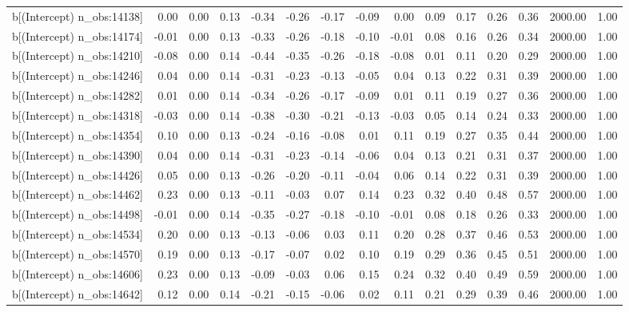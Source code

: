 \begin{table}[ht]
\begin{tabular}{rrrrrrrrrrrrrrr}
  b[(Intercept) n\_obs:14138] & 0.00 & 0.00 & 0.13 & -0.34 & -0.26 & -0.17 & -0.09 & 0.00 & 0.09 & 0.17 & 0.26 & 0.36 & 2000.00 & 1.00 \\ 
  b[(Intercept) n\_obs:14174] & -0.01 & 0.00 & 0.13 & -0.33 & -0.26 & -0.18 & -0.10 & -0.01 & 0.08 & 0.16 & 0.26 & 0.34 & 2000.00 & 1.00 \\ 
  b[(Intercept) n\_obs:14210] & -0.08 & 0.00 & 0.14 & -0.44 & -0.35 & -0.26 & -0.18 & -0.08 & 0.01 & 0.11 & 0.20 & 0.29 & 2000.00 & 1.00 \\ 
  b[(Intercept) n\_obs:14246] & 0.04 & 0.00 & 0.14 & -0.31 & -0.23 & -0.13 & -0.05 & 0.04 & 0.13 & 0.22 & 0.31 & 0.39 & 2000.00 & 1.00 \\ 
  b[(Intercept) n\_obs:14282] & 0.01 & 0.00 & 0.14 & -0.34 & -0.26 & -0.17 & -0.09 & 0.01 & 0.11 & 0.19 & 0.27 & 0.36 & 2000.00 & 1.00 \\ 
  b[(Intercept) n\_obs:14318] & -0.03 & 0.00 & 0.14 & -0.38 & -0.30 & -0.21 & -0.13 & -0.03 & 0.05 & 0.14 & 0.24 & 0.33 & 2000.00 & 1.00 \\ 
  b[(Intercept) n\_obs:14354] & 0.10 & 0.00 & 0.13 & -0.24 & -0.16 & -0.08 & 0.01 & 0.11 & 0.19 & 0.27 & 0.35 & 0.44 & 2000.00 & 1.00 \\ 
  b[(Intercept) n\_obs:14390] & 0.04 & 0.00 & 0.14 & -0.31 & -0.23 & -0.14 & -0.06 & 0.04 & 0.13 & 0.21 & 0.31 & 0.37 & 2000.00 & 1.00 \\ 
  b[(Intercept) n\_obs:14426] & 0.05 & 0.00 & 0.13 & -0.26 & -0.20 & -0.11 & -0.04 & 0.06 & 0.14 & 0.22 & 0.31 & 0.39 & 2000.00 & 1.00 \\ 
  b[(Intercept) n\_obs:14462] & 0.23 & 0.00 & 0.13 & -0.11 & -0.03 & 0.07 & 0.14 & 0.23 & 0.32 & 0.40 & 0.48 & 0.57 & 2000.00 & 1.00 \\ 
  b[(Intercept) n\_obs:14498] & -0.01 & 0.00 & 0.14 & -0.35 & -0.27 & -0.18 & -0.10 & -0.01 & 0.08 & 0.18 & 0.26 & 0.33 & 2000.00 & 1.00 \\ 
  b[(Intercept) n\_obs:14534] & 0.20 & 0.00 & 0.13 & -0.13 & -0.06 & 0.03 & 0.11 & 0.20 & 0.28 & 0.37 & 0.46 & 0.53 & 2000.00 & 1.00 \\ 
  b[(Intercept) n\_obs:14570] & 0.19 & 0.00 & 0.13 & -0.17 & -0.07 & 0.02 & 0.10 & 0.19 & 0.29 & 0.36 & 0.45 & 0.51 & 2000.00 & 1.00 \\ 
  b[(Intercept) n\_obs:14606] & 0.23 & 0.00 & 0.13 & -0.09 & -0.03 & 0.06 & 0.15 & 0.24 & 0.32 & 0.40 & 0.49 & 0.59 & 2000.00 & 1.00 \\ 
  b[(Intercept) n\_obs:14642] & 0.12 & 0.00 & 0.14 & -0.21 & -0.15 & -0.06 & 0.02 & 0.11 & 0.21 & 0.29 & 0.39 & 0.46 & 2000.00 & 1.00 \\ 

\end{tabular}
\end{table}
